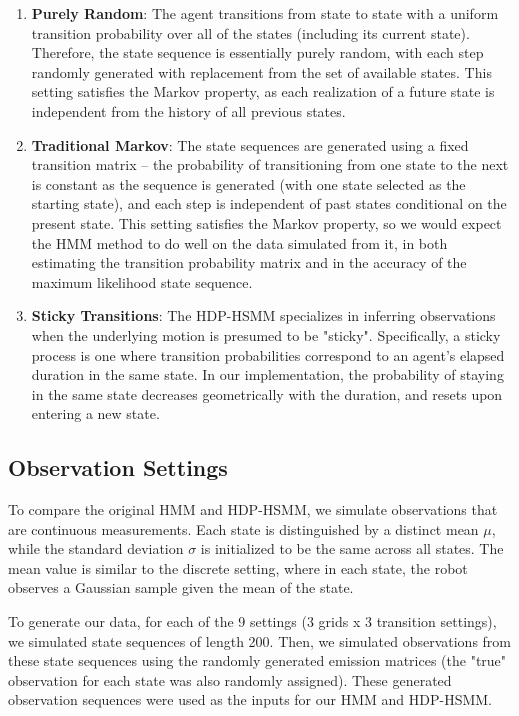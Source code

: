 \documentclass{article}
\begin{document}
\begin{enumerate}
	\item \textbf{Purely Random}: The agent transitions from state to state with a uniform transition probability over all of the states (including its current state). Therefore, the state sequence is essentially purely random, with each step randomly generated with replacement from the set of available states. This setting satisfies the Markov property, as each realization of a future state is independent from the history of all previous states.
	\item \textbf{Traditional Markov}: The state sequences are generated using a fixed transition matrix -- the probability of transitioning from one state to the next is constant as the sequence is generated (with one state selected as the starting state), and each step is independent of past states conditional on the present state. This setting satisfies the Markov property, so we would expect the HMM method to do well on the data simulated from it, in both estimating the transition probability matrix and in the accuracy of the maximum likelihood state sequence.
	\item \textbf{Sticky Transitions}: The HDP-HSMM specializes in inferring observations when the underlying motion is presumed to be "sticky". Specifically, a sticky process is one where transition probabilities correspond to an agent's elapsed duration in the same state. In our implementation, the probability of staying in the same state decreases geometrically with the duration, and resets upon entering a new state.
 \end{enumerate}

\subsection{Observation Settings}

To compare the original HMM and HDP-HSMM, we simulate observations that are continuous measurements. Each state is distinguished by a distinct mean $\mu$, while the standard deviation $\sigma$ is initialized to be the same across all states. The mean value is similar to the discrete setting, where in each state, the robot observes a Gaussian sample given the mean of the state.

To generate our data, for each of the 9 settings (3 grids x 3 transition settings), we simulated state sequences of length 200. Then, we simulated observations from these state sequences using the randomly generated emission matrices (the "true" observation for each state was also randomly assigned). These generated observation sequences were used as the inputs for our HMM and HDP-HSMM.
\end{document}
